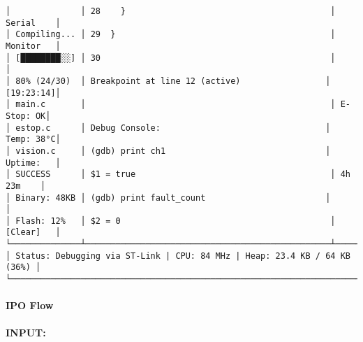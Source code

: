\documentclass[
]{article}
\begin{document}
\begin{verbatim}
│              │ 28    }                                         │ Serial    │
│ Compiling... │ 29  }                                           │ Monitor   │
│ [████████░░] │ 30                                              │           │
│ 80% (24/30)  │ Breakpoint at line 12 (active)                 │ [19:23:14]│
│ main.c       │                                                 │ E-Stop: OK│
│ estop.c      │ Debug Console:                                 │ Temp: 38°C│
│ vision.c     │ (gdb) print ch1                                │ Uptime:   │
│ SUCCESS      │ $1 = true                                       │ 4h 23m    │
│ Binary: 48KB │ (gdb) print fault_count                        │           │
│ Flash: 12%   │ $2 = 0                                          │ [Clear]   │
└──────────────┴─────────────────────────────────────────────────┴───────────┘
│ Status: Debugging via ST-Link | CPU: 84 MHz | Heap: 23.4 KB / 64 KB (36%) │
└────────────────────────────────────────────────────────────────────────────┘
\end{verbatim}

\hypertarget{ipo-flow-4}{%
\paragraph{IPO Flow}\label{ipo-flow-4}}

\textbf{INPUT:}
\end{document}
